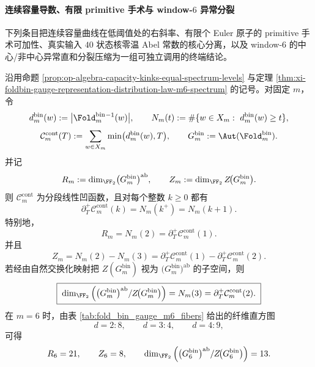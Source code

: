 \paragraph{连续容量导数、有限 primitive 手术与 window-\texorpdfstring{$6$}{6} 异常分裂}
下列条目把连续容量曲线在低阈值处的右斜率、有限个 Euler 原子的 primitive 手术可加性、真实输入 \(40\) 状态核零温 Abel 常数的核心分离，以及 window-\(6\) 的中心/非中心异常直和分裂压缩为一组可独立调用的终端结论。

\begin{theorem}\label{thm:xi-foldbin-continuous-capacity-right-derivative-abelian-center}
沿用命题 \ref{prop:op-algebra-capacity-kinks-equal-spectrum-levels} 与定理 \ref{thm:xi-foldbin-gauge-representation-distribution-law-m6-spectrum} 的记号。对固定 \(m\)，令
\[
d_m^{\mathrm{bin}}(w):=\bigl|\Fold_m^{\mathrm{bin}}{}^{-1}(w)\bigr|,
\qquad
N_m(t):=\#\{w\in X_m:\ d_m^{\mathrm{bin}}(w)\ge t\},
\]
\[
\mathcal C_m^{\mathrm{cont}}(T):=\sum_{w\in X_m}\min\bigl(d_m^{\mathrm{bin}}(w),T\bigr),
\qquad
G_m^{\mathrm{bin}}:=\Aut(\Fold_m^{\mathrm{bin}}).
\]
并记
\[
R_m:=\dim_{\FF_2}\bigl(G_m^{\mathrm{bin}}\bigr)^{\mathrm{ab}},
\qquad
Z_m:=\dim_{\FF_2} Z\!\bigl(G_m^{\mathrm{bin}}\bigr).
\]
则 \(\mathcal C_m^{\mathrm{cont}}\) 为分段线性凹函数，且对每个整数 \(k\ge 0\) 都有
\[
\partial_T^{+}\mathcal C_m^{\mathrm{cont}}(k)=N_m(k^+)=N_m(k+1).
\]
特别地，
\[
\boxed{\;
R_m
=
N_m(2)
=
\partial_T^{+}\mathcal C_m^{\mathrm{cont}}(1).\;}
\]
并且
\[
\boxed{\;
Z_m
=
N_m(2)-N_m(3)
=
\partial_T^{+}\mathcal C_m^{\mathrm{cont}}(1)-\partial_T^{+}\mathcal C_m^{\mathrm{cont}}(2).\;}
\]
若经由自然交换化映射把 \(Z(G_m^{\mathrm{bin}})\) 视为 \(\bigl(G_m^{\mathrm{bin}}\bigr)^{\mathrm{ab}}\) 的子空间，则
\[
\boxed{\;
\dim_{\FF_2}
\left(
\bigl(G_m^{\mathrm{bin}}\bigr)^{\mathrm{ab}}/Z\!\bigl(G_m^{\mathrm{bin}}\bigr)
\right)
=
N_m(3)
=
\partial_T^{+}\mathcal C_m^{\mathrm{cont}}(2).\;}
\]
在 \(m=6\) 时，由表 \ref{tab:fold_bin_gauge_m6_fibers} 给出的纤维直方图
\[
d=2:8,\qquad d=3:4,\qquad d=4:9,
\]
可得
\[
R_6=21,
\qquad
Z_6=8,
\qquad
\dim_{\FF_2}
\left(
\bigl(G_6^{\mathrm{bin}}\bigr)^{\mathrm{ab}}/Z\!\bigl(G_6^{\mathrm{bin}}\bigr)
\right)
=13.
\]
\end{theorem}
